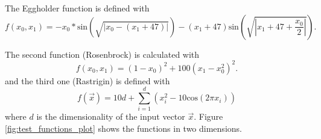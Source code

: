 The Eggholder function is defined with \cite{whitley1996evaluating} 
\begin{equation}
	f(x_0, x_1) = -x_0 * \text{sin}(\sqrt{ | x_0 - (x_1 + 47) | }) - (x_1 + 47) \text{sin}(\sqrt{ | x_1 +47 + \frac{x_0}{2} | }).
\end{equation}

The second function (Rosenbrock) \cite{yang2010engineering} is calculated with 
\begin{equation}
	f(x_0, x_1) = (1-x_0)^2 + 100 (x_1 - x_0^2)^2.
\end{equation} 
and the third one (Rastrigin) \cite{yang2010engineering} is defined with
\begin{equation}
	f(\vec{x}) = 10 d + \sum_{ i = 1 }^{d} (x_i^2 - 10 \text{cos}(2 \pi x_i))
\end{equation} 
where $ d $ is the dimensionality of the input vector $ \vec{x} $. Figure \ref{fig:test_functions_plot} shows the functions in two dimensions.


